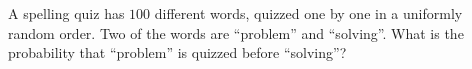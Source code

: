 A spelling quiz has $100$ different words, quizzed one by one in a uniformly random order. Two of the words are ``problem'' and ``solving''. What is the probability that ``problem'' is quizzed before ``solving''?
